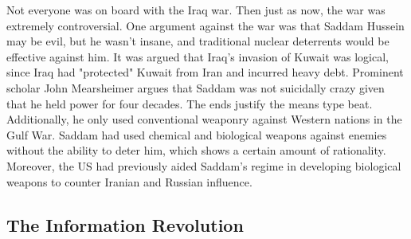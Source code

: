 \documentclass[nobib]{tufte-handout}
\begin{document}
Not everyone was on board with the Iraq war. Then just as now, 
the war was extremely controversial. One argument against 
the war was that Saddam Hussein may be evil, but he wasn't insane, 
and traditional nuclear deterrents would be effective against him. 
It was argued that Iraq's invasion of Kuwait 
was logical, since Iraq had "protected" Kuwait 
from Iran and incurred heavy debt. Prominent scholar 
John Mearsheimer argues that Saddam was not 
suicidally crazy given that he held power for four 
decades. The ends justify the means type beat. 
Additionally, he only used conventional weaponry 
against Western nations in the Gulf War. Saddam had 
used chemical and biological weapons against enemies 
without the ability to deter him, which shows a 
certain amount of rationality. Moreover, the US had previously 
aided Saddam's regime in developing biological 
weapons to counter Iranian and Russian influence. 


\subsection{The Information Revolution}
\end{document}
